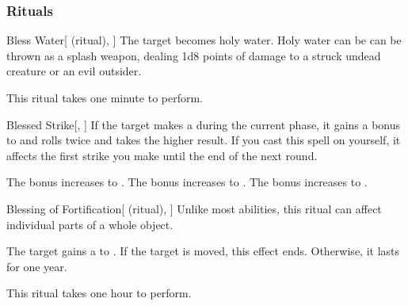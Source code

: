 \subsubsection{Rituals}


\lowercase{\hypertarget{spell:Bless Water}{}}\label{spell:Bless Water}
\begin{attuneability}[Rank 1]{\hypertarget{spell:Bless Water}{Bless Water}}[ (ritual), ]
The target becomes holy water.
Holy water can be can be thrown as a splash weapon, dealing 1d8 points of damage to a struck undead creature or an evil outsider.

This ritual takes one minute to perform.
\end{attuneability}
\vspace{0.25em}



\lowercase{\hypertarget{spell:Blessed Strike}{}}\label{spell:Blessed Strike}
\begin{freeability}[Rank 1]{\hypertarget{spell:Blessed Strike}{Blessed Strike}}[, ]
If the target makes a  during the current phase,
it gains a  bonus to  and rolls twice and takes the higher result.
If you cast this spell on yourself, it affects the first strike you make until the end of the next round.

\rankline
{} The bonus increases to .
 The bonus increases to .
 The bonus increases to .
\end{freeability}
\vspace{0.25em}



\lowercase{\hypertarget{spell:Blessing of Fortification}{}}\label{spell:Blessing of Fortification}
\begin{attuneability}[Rank 1]{\hypertarget{spell:Blessing of Fortification}{Blessing of Fortification}}[ (ritual), ]
Unlike most abilities, this ritual can affect individual parts of a whole object.

The target gains a   to .
If the target is moved, this effect ends.
Otherwise, it lasts for one year.

This ritual takes one hour to perform.
\end{attuneability}
\vspace{0.25em}



